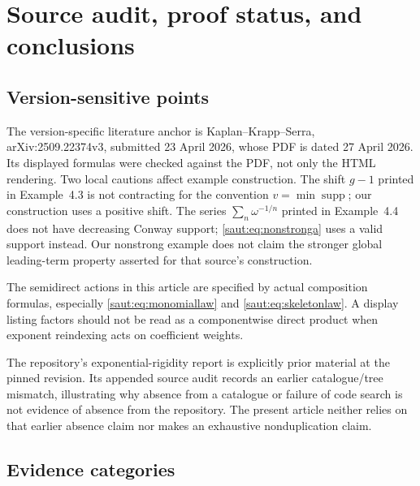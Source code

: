 \documentclass[11pt]{article}
\theoremstyle{definition}
\theoremstyle{remark}
\newcommand{\supp}{\operatorname{supp}}
\numberwithin{equation}{section}
\begin{document}
\section{Source audit, proof status, and conclusions}\label{saut:sec:audit}

\subsection{Version-sensitive points}

The version-specific literature anchor is Kaplan--Krapp--Serra,
arXiv:2509.22374v3, submitted 23 April 2026, whose PDF is dated 27 April
2026. Its displayed formulas were checked against the PDF, not only the
HTML rendering. Two local cautions affect example construction. The
shift $g-1$ printed in Example~4.3 is not contracting for the convention
$v=\min\supp$; our construction uses a positive shift. The series
$\sum_n\omega^{-1/n}$ printed in Example~4.4 does not have decreasing
Conway support; \eqref{saut:eq:nonstronga} uses a valid support instead.
Our nonstrong example does not claim the stronger global leading-term
property asserted for that source's construction.

The semidirect actions in this article are specified by actual composition
formulas, especially \eqref{saut:eq:monomiallaw} and \eqref{saut:eq:skeletonlaw}.
A display listing factors should not be read as a componentwise direct
product when exponent reindexing acts on coefficient weights.

The repository's exponential-rigidity report is explicitly prior material
at the pinned revision. Its appended source audit records an earlier
catalogue/tree mismatch, illustrating why absence from a catalogue or
failure of code search is not evidence of absence from the repository.
The present article neither relies on that earlier absence claim nor
makes an exhaustive nonduplication claim.

\subsection{Evidence categories}
\end{document}
